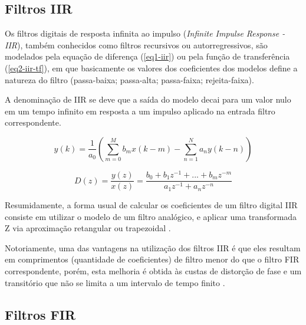 	\subsection{Filtros IIR}
		
		Os filtros digitais de resposta infinita ao impulso (\textit{Infinite Impulse Response - IIR}), também conhecidos como filtros recursivos ou autorregressivos, são modelados pela equação de diferença (\ref{eq1-iir}) ou pela função de transferência (\ref{eq2-iir-tf}), em que basicamente os valores dos coeficientes dos modelos define a natureza do filtro (passa-baixa; passa-alta; passa-faixa; rejeita-faixa).
		
		A denominação de IIR se deve que a saída do modelo decai para um valor nulo em um tempo infinito em resposta a um impulso aplicado na entrada filtro correspondente.
		
		\begin{equation}
			y(k) = \frac{1}{a_0}\left(\sum_{m=0}^{M}b_mx(k-m)-\sum_{n=1}^{N} a_ny(k-n)\right)
			\label{eq1-iir}
		\end{equation}
		
		\begin{equation}
			D(z) = \frac{y(z)}{x(z)} = \frac{b_0 + b_1z^{-1}+...+ b_mz^{-m}}{a_1z^{-1}+ a_nz^{-n}}
			\label{eq2-iir-tf}
		\end{equation}
		
		Resumidamente, a forma usual de calcular os coeficientes de um filtro digital IIR consiste em utilizar o modelo de um filtro analógico, e aplicar uma transformada Z via aproximação retangular ou trapezoidal \cite{Oppenhein1998}.
		
		Notoriamente, uma das vantagens na utilização dos filtros IIR é que eles resultam em comprimentos (quantidade de coeficientes) de filtro menor do que o filtro FIR correspondente, porém, esta melhoria é obtida às custas de distorção de fase e um transitório que não se limita a um intervalo de tempo finito \cite{Roberts1987}.
		
		
	\subsection{Filtros FIR}
		
